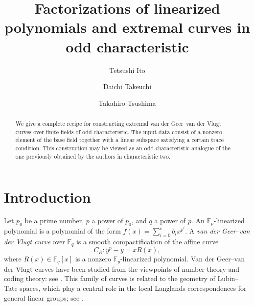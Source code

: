\documentclass[12pt,a4paper]{amsart}
\theoremstyle{definition}
\def\F{{\mathbb F}}
\theoremstyle{remark}
\begin{document}
\title[Factorizations of linearized polynomials and extremal Curves]{Factorizations of linearized polynomials and extremal curves in odd characteristic}

\author{Tetsushi Ito}
\address{
Department of Mathematics, Faculty of Science, Kyoto University
Kyoto, 606--8502, Japan}

\author{Daichi Takeuchi}
\address{Department of Mathematics,
Institute of Science Tokyo,
2-12-1 Ookayama, Meguro-ku, Tokyo, 152-8551, Japan
}

\author{Takahiro Tsushima}
\address{
Keio University School of Medicine,
4-1-1 Hiyoshi, Kohoku-ku,
Yokohama, 223-8521, Japan}

\date{}




\begin{abstract}
We give a complete recipe for constructing extremal van der Geer--van der Vlugt curves over finite fields of odd 
characteristic. The input data consist of a nonzero element of the base field together with a linear subspace satisfying a certain trace condition. This construction may be viewed as an odd-characteristic analogue of the one previously obtained by the authors in characteristic two. 
\end{abstract}
\maketitle
\section{Introduction}\label{Introduction}
Let $p_0$ be a prime number, $p$ a power of $p_0$, and $q$ a power of $p$. 
An $\F_p$-linearized polynomial is a polynomial of the form $f(x)=\sum_{i=0}^e b_i x^{p^i}$. 
A \emph{van der Geer--van der Vlugt curve} over $\F_q$ is a smooth compactification of the affine curve 
\[
C_R \colon y^p-y=xR(x), 
\]
where $R(x)\in\F_q[x]$ is a nonzero $\F_p$-linearized polynomial. 
Van der Geer--van der Vlugt curves have been studied from the viewpoints of number theory and coding theory: see \cite{AM, BHMSSV, CO0, GV, ITT, ITT0, ITT1, TT}.
This family of curves is related to the geometry of Lubin--Tate spaces, which play a central role in the local Langlands correspondences for general linear groups; see \cite{IT, We}. 
\end{document}
